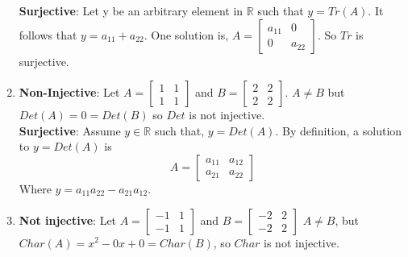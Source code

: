 \documentclass{article}
\theoremstyle{problem}
\theoremstyle{plain}
\theoremstyle{remark}
\begin{document}
\begin{enumerate}
      \textbf{Surjective}: Let y be an arbitrary element in $\mathbb{R}$ such that $y = Tr(A)$. It follows that $y = a_{11} + a_{22}$. One solution is, $A = 
      \begin{bmatrix}
        a_{11} & 0\\
        0 & a_{22}
      \end{bmatrix}$. So $Tr$ is surjective. 

    \item \textbf{Non-Injective}: Let $A = 
      \begin{bmatrix}
        1 & 1\\
        1 & 1
      \end{bmatrix}$
      and $B =
      \begin{bmatrix}
        2 & 2\\
        2 & 2
      \end{bmatrix}$. $A \not = B$ but $Det(A) = 0 = Det(B)$ so $Det$ is not injective.\\
      \textbf{Surjective}: Assume $y \in \mathbb{R}$ such that, $y = Det(A)$. By definition, a solution to $y = Det(A)$ is 
      $$A = 
      \begin{bmatrix}
        a_{11} & a_{12}\\
        a_{21} & a_{22}
      \end{bmatrix}$$
Where $y = a_{11}a_{22} - a_{21}a_{12}$.
    \item \textbf{Not injective}: Let $A = 
      \begin{bmatrix}
        -1 & 1\\
        -1 & 1
      \end{bmatrix}$ and $B = 
      \begin{bmatrix}
        -2 & 2\\
        -2 & 2
      \end{bmatrix}$ $A \not = B$, but $Char(A) = x^2 - 0x + 0 = Char(B)$, so $Char$ is not injective.\\      


\end{enumerate}
\end{document}
